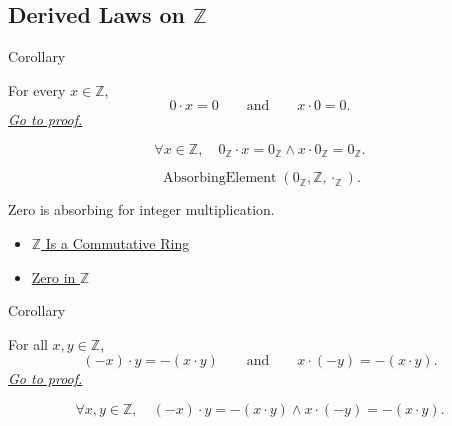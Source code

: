 \subsection*{\texorpdfstring{Derived Laws on $\mathbb{Z}$}{Derived Laws on Z}}

\begin{corollarybox}{Corollary}
\begin{corollary}
\label{cor:zero-absorption-on-z}
For every $x\in\mathbb{Z}$,
\[
0\cdot x=0
\qquad\text{and}\qquad
x\cdot 0=0.
\]
\hyperref[prf:zero-absorption-on-z]{\textit{Go to proof.}}
\end{corollary}
\end{corollarybox}

\begin{remark*}
\[
\forall x\in\mathbb{Z},\quad
0_{\mathbb{Z}}\cdot x=0_{\mathbb{Z}}\land x\cdot0_{\mathbb{Z}}=0_{\mathbb{Z}}.
\]
\end{remark*}

\begin{remark*}
\[
\operatorname{AbsorbingElement}(0_{\mathbb{Z}},\mathbb{Z},\cdot_{\mathbb{Z}}).
\]
\end{remark*}

\begin{remark*}[Interpretation]
Zero is absorbing for integer multiplication.
\end{remark*}

\begin{dependencies}
\begin{itemize}
  \item \hyperref[thm:z-commutative-ring]{$\mathbb{Z}$ Is a Commutative Ring}
  \item \hyperref[def:zero-in-z]{Zero in $\mathbb{Z}$}
\end{itemize}
\end{dependencies}

\begin{corollarybox}{Corollary}
\begin{corollary}
\label{cor:sign-rule-on-z}
For all $x,y\in\mathbb{Z}$,
\[
(-x)\cdot y=-(x\cdot y)
\qquad\text{and}\qquad
x\cdot(-y)=-(x\cdot y).
\]
\hyperref[prf:sign-rule-on-z]{\textit{Go to proof.}}
\end{corollary}
\end{corollarybox}

\begin{remark*}
\[
\forall x,y\in\mathbb{Z},\quad
(-x)\cdot y=-(x\cdot y)\land x\cdot(-y)=-(x\cdot y).
\]
\end{remark*}

